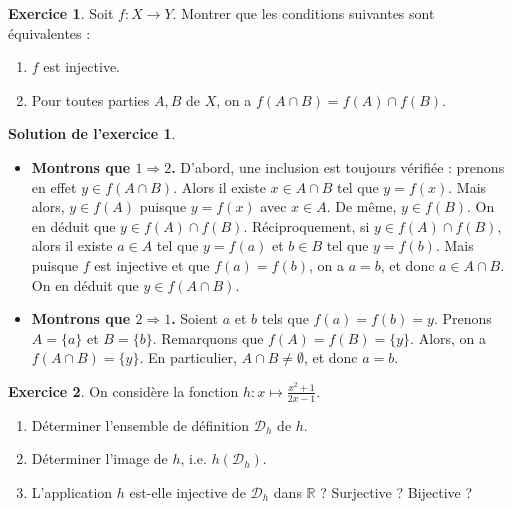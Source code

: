 \documentclass[a4paper, 11pt,openany]{article}%
\theoremstyle{plain}
\theoremstyle{definition}
\newtheorem{exo}{Exercice}
\newtheorem{sol}{Solution de l'exercice}
\theoremstyle{remark}
\newcommand{\R}{\mathbb{R}}
\newcommand{\calD}{\mathcal{D}}
\begin{document}
\begin{exo}
Soit $f:X \to Y$. Montrer que les conditions suivantes sont équivalentes :
\begin{enumerate}
\item $f$ est injective.
\item Pour toutes parties $A,B$ de $X$, on a $f(A \cap B)=f(A) \cap f(B)$. 
\end{enumerate}
\end{exo}

\begin{sol}
\begin{itemize}
\item \textbf{Montrons que $1 \Rightarrow 2$.} D'abord, une inclusion est toujours vérifiée : prenons en effet $y \in f(A \cap B)$. Alors il existe $x \in A \cap B$ tel que $y=f(x)$. Mais alors, $y \in f(A)$ puisque $y=f(x)$ avec $x \in A$. De même, $y \in f(B)$. On en déduit que $y \in f(A) \cap f(B)$. Réciproquement, si $y \in f(A) \cap f(B)$, alors il existe $a\in A$ tel que $y=f(a)$ et $b \in B$ tel que $y=f(b)$. Mais puisque $f$ est injective et que $f(a)=f(b)$, on a $a=b$, et donc $a \in A \cap B$. On en déduit que $y \in f(A\cap B)$.
\item \textbf{Montrons que $2 \Rightarrow 1$.} Soient $a$ et $b$ tels que $f(a)=f(b)=y$. Prenons $A=\{a \}$ et $B=\{b\}$. Remarquons que $f(A)=f(B)=\{y\}$. Alors, on a $f(A\cap B)=\{y\}$. En particulier, $A\cap B \neq \emptyset$, et donc $a=b$. 
\end{itemize}
\end{sol}



\begin{exo}
On considère la fonction 
$ h : x \mapsto \frac{x^2 +1}{2x - 1}$.
\begin{enumerate}
\item Déterminer l'ensemble de définition $\calD_h$ de $h$.
\item Déterminer l'image de $h$, i.e. $h(\calD_h)$.
\item L'application $h$ est-elle injective de $\calD_h$ dans $\R$ ? Surjective ? Bijective ?
\end{enumerate}
\end{exo}
\end{document}
